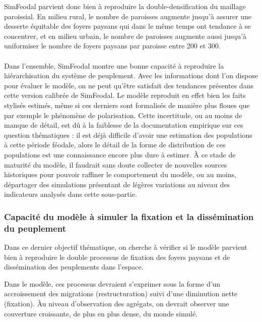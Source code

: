 SimFeodal parvient donc bien à reproduire la double-densification du maillage paroissial.
En milieu rural, le nombre de paroisses augmente jusqu'à assurer une desserte équitable des foyers paysans qui dans le même temps ont tendance à se concentrer, et en milieu urbain, le nombre de paroisses augmente aussi jusqu'à uniformiser le nombre de foyers paysans par paroisse entre 200 et 300.

\bigskip
\paragraph[Conclusion intermédiaire]{}
Dans l'ensemble, SimFeodal montre une bonne capacité à reproduire la hiérarchisation du système de peuplement.
Avec les informations dont l'on dispose pour évaluer le modèle, on ne peut qu'être satisfait des tendances présentes dans cette version calibrée de SimFeodal.
Le modèle reproduit en effet bien les faits stylisés estimés, même si ces derniers sont formalisés de manière plus floues que par exemple le phénomène de polarisation.
Cette incertitude, ou au moins de manque de détail, est dû à la faiblesse de la documentation empirique sur ces question thématiques : il est déjà difficile d'avoir une estimation des populations à cette période féodale, alors le détail de la forme de distribution de ces populations est une connaissance encore plus dure à estimer.
À ce stade de maturité du modèle, il faudrait sans doute collecter de nouvelles sources historiques pour pouvoir raffiner le comportement du modèle, ou au moins, départager des simulations présentant de légères variations au niveau des indicateurs analysés dans cette sous-partie.

\clearpage
\subsubsection{Capacité du modèle à simuler la fixation et la dissémination du peuplement \label{sssec:fixation-dissemination}}

Dans ce dernier objectif thématique, on cherche à vérifier si le modèle parvient bien à reproduire le double processus de fixation des foyers paysans et de dissémination des peuplements dans l'espace.

Dans le modèle, ces processus devraient s'exprimer sous la forme d'un accroissement des migrations (restructuration) suivi d'une diminution nette (fixation).
Àu niveau d'observation des agrégats, on devrait observer une couverture croissante, de plus en plus dense, du monde simulé.

